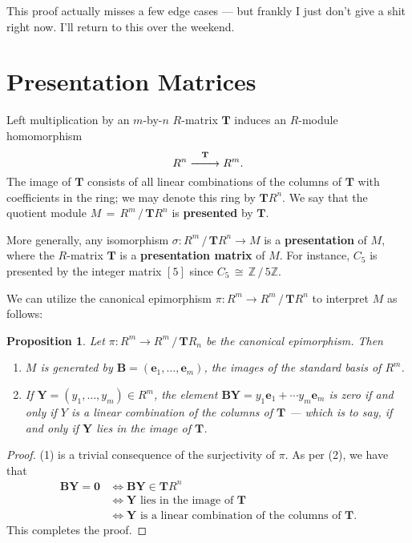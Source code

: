 \documentclass[11pt]{article}
\newtheorem{proposition}{Proposition}
\renewcommand{\longrightarrow}{\xrightarrow{\hspace*{0.7cm}}}
\renewcommand{\vec}[1]{\mathbf{#1}}
\newcommand{\mat}[1]{\mathbf{#1}}
\begin{document}
This proof actually misses a few edge cases --- but frankly I just don't give a shit right now. I'll return to this over the weekend.


\section{Presentation Matrices}

Left multiplication by an $m$-by-$n$ $R$-matrix $\mat{T}$ induces an $R$-module homomorphism
\[
  R^{n} \stackrel{\mat{T}}{\longrightarrow} R^{m}. 
\]
The image of $\mat{T}$ consists of all linear combinations of the columns of $\mat{T}$ with coefficients in the ring; we may denote this ring by $\mat{T} R^{n}$. We say that the quotient module $M \, = \, R^{m} \, / \, \mat{T} R^{n}$ is \textbf{presented} by $\mat{T}$. 

More generally, any isomorphism $\sigma : R^{m} \, / \, \mat{T} R^{n} \to M$ is a \textbf{presentation} of $M$, where the $R$-matrix $\mat{T}$ is a \textbf{presentation matrix} of $M$. For instance, $C_{5}$ is presented by the integer matrix $[5]$ since $C_{5} \, \cong \, \mathbb{Z} \, / \, 5 \mathbb{Z}$.

We can utilize the canonical epimorphism $\pi : R^{m} \to R^{m} \, / \, \mat{T} R^{n}$ to interpret $M$ as follows:

\begin{adjustwidth}{0.5cm}{}
  \begin{proposition}
    Let $\pi : R^{m} \to R^{m} \, / \, \mat{T} R_{n}$ be the canonical epimorphism. Then 
    \begin{enumerate}
      \item $M$ is generated by $\vec{B} = (\vec{e}_{1}, \ldots, \vec{e}_{m})$, the images of the standard basis of $R^{m}$.
      \item If $\vec{Y} = (y_{1}, \ldots, y_{m}) \in R^{m}$, the element $\mat{B}\vec{Y} = y_{1} \vec{e}_{1} + \cdots y_{m} \vec{e}_{m}$ is zero if and only if $Y$ is a linear combination of the columns of $\vec{T}$ --- which is to say, if and only if $\vec{Y}$ lies in the image of $\mat{T}$.
    \end{enumerate}
  \end{proposition}
  \begin{proof}
    (1) is a trivial consequence of the surjectivity of $\pi$. As per (2), we have that
    \begin{align*}
      \text{$\vec{BY} = \vec{0}$} & \iff \text{$\vec{BY} \in \mat{T} R^{n}$} \\ 
                                  & \iff \text{$\vec{Y}$ lies in the image of $\mat{T}$} \\
                                  & \iff \text{$\vec{Y}$ is a linear combination of the columns of $\mat{T}$}.
    \end{align*}
    This completes the proof.
  \end{proof}
\end{adjustwidth}
\end{document}
